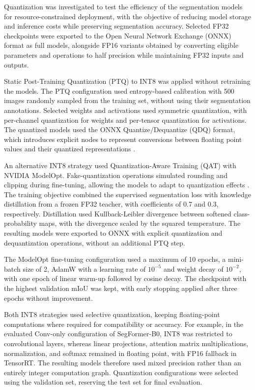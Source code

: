 Quantization was investigated to test the efficiency of the segmentation models for resource-constrained deployment, with the objective of reducing model storage and inference costs while preserving segmentation accuracy. Selected FP32 checkpoints were exported to the Open Neural Network Exchange (ONNX) format as full  models, alongside FP16 variants obtained by converting eligible parameters and operations to half precision while maintaining FP32 inputs and outputs.

Static Post-Training Quantization (PTQ) to INT8 was applied without retraining the models. The PTQ configuration used entropy-based calibration with 500 images randomly sampled from the training set, without using their segmentation annotations. Selected weights and activations used symmetric quantization, with per-channel quantization for weights and per-tensor quantization for activations. The quantized models used the ONNX Quantize/Dequantize (QDQ) format, which introduces explicit nodes to represent conversions between floating point values and their quantized representations \cite{onnxruntimeQuantization}.

An alternative INT8 strategy used Quantization-Aware Training (QAT) with NVIDIA ModelOpt. Fake-quantization operations simulated rounding and clipping during fine-tuning, allowing the models to adapt to quantization effects \cite{jacob2018quantization}. The training objective combined the supervised segmentation loss with knowledge distillation from a frozen FP32 teacher, with coefficients of 0.7 and 0.3, respectively. Distillation used Kullback-Leibler divergence between softened class-probability maps, with the divergence scaled by the squared temperature. The resulting models were exported to ONNX with explicit quantization and dequantization operations, without an additional PTQ step.

The ModelOpt fine-tuning configuration used a maximum of 10 epochs, a mini-batch size of 2, AdamW with a learning rate of \(10^{-5}\) and weight decay of \(10^{-2}\), with one epoch of linear warm-up followed by cosine decay. The checkpoint with the highest validation mIoU was kept, with early stopping applied after three epochs without improvement.

Both INT8 strategies used selective quantization, keeping floating-point computations where required for compatibility or accuracy. For example, in the evaluated Conv-only configuration of SegFormer-B0, INT8 was restricted to convolutional layers, whereas linear projections, attention matrix multiplications, normalization, and softmax remained in floating point, with FP16 fallback in TensorRT. The resulting models therefore used mixed precision rather than an entirely integer computation graph.
Quantization configurations were selected using the validation set, reserving the test set for final evaluation.
